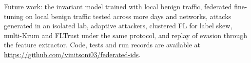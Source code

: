 \documentclass[conference]{IEEEtran}
\begin{document}
Future work: the invariant model trained with local benign traffic, federated fine-tuning on local benign traffic tested across more days and networks, attacks generated in an isolated lab, adaptive attackers, clustered FL for label skew, multi-Krum and FLTrust under the same protocol, and replay of evasion through the feature extractor. Code, tests and run records are available at \url{https://github.com/vinitsoni03/federated-ids}.



\end{document}
